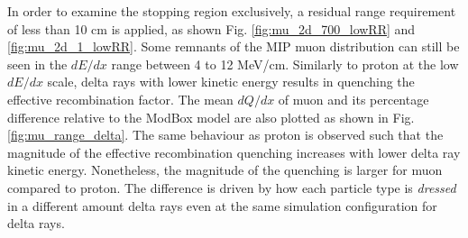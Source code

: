 In order to examine the stopping region exclusively, a residual range requirement of less than 10 cm is applied, as shown Fig. \ref{fig:mu_2d_700_lowRR} and \ref{fig:mu_2d_1_lowRR}. 
Some remnants of the MIP muon distribution can still be seen in the $dE/dx$ range between 4 to 12 MeV/cm. 
Similarly to proton at the low $dE/dx$ scale, delta rays with lower kinetic energy results in quenching the effective recombination factor. 
The mean $dQ/dx$ of muon and its percentage difference relative to the ModBox model are also plotted as shown in Fig. \ref{fig:mu_range_delta}.
The same behaviour as proton is observed such that the magnitude of the effective recombination quenching increases with lower delta ray kinetic energy.
Nonetheless, the magnitude of the quenching is larger for muon compared to proton.
The difference is driven by how each particle type is \textit{dressed} in a different amount delta rays even at the same simulation configuration for delta rays.
